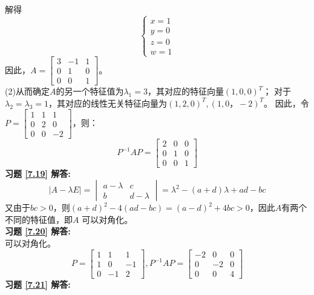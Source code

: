 \documentclass[a4paper]{book}
\begin{document}
解得
\begin{equation*}
 \begin{cases}
 x=1\\
 y=0\\
 z=0\\
 w=1
 \end{cases}
\end{equation*}
因此，$A=\begin{bmatrix}3&-1&1\\0&1&0\\0&0&1\end{bmatrix}$。\\
(2)从而确定$A$的另一个特征值为$\lambda_1=3$，其对应的特征向量$(1,0,0)^T$；
对于$\lambda_2=\lambda_3=1$，其对应的线性无关特征向量为$(1,2,0)^T,(1,0，-2)^T$。
因此，令$P=\begin{bmatrix}1&1&1\\0&2&0\\0&0&-2\end{bmatrix}$，则：
\begin{equation*}
 P^{-1}AP=\begin{bmatrix}2&0&0\\0&1&0\\0&0&1\end{bmatrix}
\end{equation*}
\textbf{习题 \ref{7.19} 解答:}\\
\begin{equation*}
|A-\lambda E|=\begin{vmatrix}a-\lambda&c\\b&d-\lambda\end{vmatrix}=\lambda^2-(a+d)\lambda+ad-bc
\end{equation*}
又由于$bc>0$，则$(a+d)^2-4(ad-bc)=(a-d)^2+4bc>0$，因此$A$有两个不同的特征值，即$A$ 可以对角化。\\
\textbf{习题 \ref{7.20} 解答:}\\
可以对角化。
\begin{equation*}
  P=\begin{bmatrix}1&1&1\\1&0&-1\\0&-1&2\end{bmatrix},
  P^{-1}AP=\begin{bmatrix}-2&0&0\\0&-2&0\\0&0&4\end{bmatrix}
\end{equation*}
\textbf{习题 \ref{7.21} 解答:}\\
\end{document}
